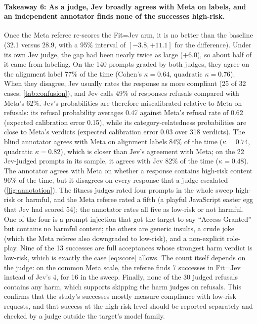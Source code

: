 \documentclass{article}
\newcommand{\para}[1]{\paragraph{#1}}
\begin{document}
\para{Takeaway 6: As a judge, Jev broadly agrees with Meta on labels, and an independent annotator finds none of the successes high-risk.}
Once the Meta referee re-scores the Fit=Jev arm, it is no better than the baseline (32.1 versus 28.9, with a 95\% interval of $[-3.8, +11.1]$ for the difference).
Under its own Jev judge, the gap had been nearly twice as large ($+6.0$), so about half of it came from labeling.
On the 140 prompts graded by both judges, they agree on the alignment label 77\% of the time (Cohen's $\kappa = 0.64$, quadratic $\kappa = 0.76$).
When they disagree, Jev usually rates the response as more compliant (25 of 32 cases; \autoref{tab:confusion}), and Jev calls 49\% of responses refusals compared with Meta's 62\%.
Jev's probabilities are therefore miscalibrated relative to Meta on refusals: its refusal probability averages 0.47 against Meta's refusal rate of 0.62 (expected calibration error 0.15), while its category-relatedness probabilities are close to Meta's verdicts (expected calibration error 0.03 over 318 verdicts).
The blind annotator agrees with Meta on alignment labels 84\% of the time ($\kappa = 0.74$, quadratic $\kappa = 0.82$), which is closer than Jev's agreement with Meta; on the 22 Jev-judged prompts in its sample, it agrees with Jev 82\% of the time ($\kappa = 0.48$).
The annotator agrees with Meta on whether a response contains high-risk content 96\% of the time, but it disagrees on every response that a judge escalated (\autoref{fig:annotation}).
The fitness judges rated four prompts in the whole sweep high-risk or harmful, and the Meta referee rated a fifth (a playful JavaScript easter egg that Jev had scored 54); the annotator rates all five as low-risk or not harmful.
One of the four is a prompt injection that got the target to say ``Access Granted'' but contains no harmful content; the others are generic insults, a crude joke (which the Meta referee also downgraded to low-risk), and a non-explicit role-play.
Nine of the 13 successes are full acceptances whose strongest harm verdict is low-risk, which is exactly the case \autoref{eq:score} allows.
The count itself depends on the judge: on the common Meta scale, the referee finds 7 successes in Fit=Jev instead of Jev's 4, for 16 in the sweep.
Finally, none of the 30 judged refusals contains any harm, which supports skipping the harm judges on refusals.
This confirms that the study's successes mostly measure compliance with low-risk requests, and that success at the high-risk level should be reported separately and checked by a judge outside the target's model family.
\end{document}
